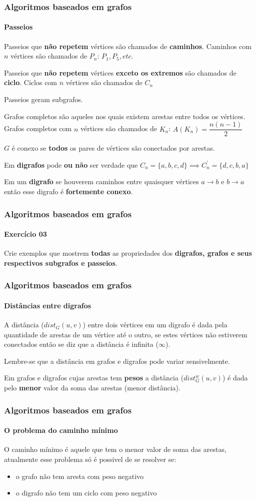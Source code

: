 \begin{frame}
	\frametitle{Algoritmos baseados em grafos}
	\framesubtitle{Passeios}
	\par Passeios que \textbf{não repetem} vértices são chamados de \textbf{caminhos}. Caminhos com $n$ vértices são chamados de $P_n$: $P_1, P_5, etc.$
	\par Passeios que \textbf{não repetem} vértices \textbf{exceto os extremos} são chamados de \textbf{ciclo}. Ciclos com $n$ vértices são chamados de $C_n$
	\par Passeios geram subgrafos.
	\par Grafos completos são aqueles nos quais existem arestas entre todos os vértices. Grafos completos com $n$ vértices são chamados de $K_n$: $A(K_n) = \dfrac{n(n-1)}{2}$
	\par $G$ é conexo se \textbf{todos} os pares de vértices são conectados por arestas.
	\par Em \textbf{digrafos} pode \textbf{ou não} ser verdade que $C_n =\{a, b, c, d\} \implies C_n^{'} =\{d, c, b, a\}$
	\par Em um \textbf{digrafo} se houverem caminhos entre quaisquer vértices $a \rightarrow b$ e $b \rightarrow a$ então esse digrafo é \textbf{fortemente conexo}.
\end{frame}

\begin{frame}
	\frametitle{Algoritmos baseados em grafos}
	\framesubtitle{Exercício 03}
	\par Crie exemplos que mostrem \textbf{todas} as propriedades dos \textbf{digrafos, grafos e seus respectivos subgrafos e passeios}.
\end{frame}

\begin{frame}
	\frametitle{Algoritmos baseados em grafos}
	\framesubtitle{Distâncias entre digrafos}
	\par A distância ($dist_G(u,v)$) entre dois vértices em um digrafo é dada pela quantidade de arestas de um vértice até o outro, se estes vértices não estiverem conectados então se diz que a distância é infinita ($\infty$).
	\par Lembre-se que a distância em grafos e digrafos pode variar sensivelmente.
	\par Em grafos e digrafos cujas arestas tem \textbf{pesos} a distância ($dist^w_G(u,v)$) é dada pelo \textbf{menor} valor da soma das arestas (menor distância).
\end{frame}

\begin{frame}
	\frametitle{Algoritmos baseados em grafos}
	\framesubtitle{O problema do caminho mínimo}
	\par O caminho mínimo é aquele que tem o menor valor de soma das arestas, atualmente esse problema só é possivel de se resolver se:
	\begin{itemize}
		\item o grafo não tem aresta com peso negativo
		\item o digrafo não tem um ciclo com peso negativo
	\end{itemize}
\end{frame}

